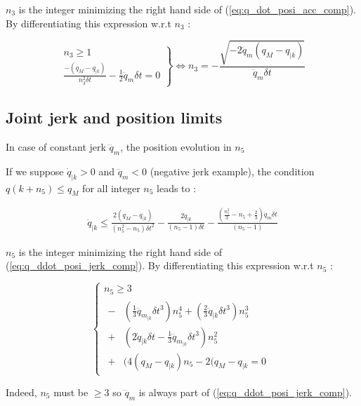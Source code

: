 \documentclass[a4paper, 10pt, conference]{ieeeconf}      %
\begin{document}
{{$n_3$ is the integer minimizing the right hand side of (\ref{eq:q_dot_posi_acc_comp}). By differentiating this expression w.r.t $n_3$ :

\begin{equation} 
\left. \begin{array}{r} 
n_3 \geq 1 \\
\frac{-(q_M-q_{|k})}{n_3^2 \delta t} - \frac{1}{2} \ddot{q}_m \delta t= 0
\end{array} \right\} 
\Leftrightarrow n_3=-\frac{\sqrt{-2\ddot{q}_m(q_M-q_{|k})}}{\ddot{q}_m \delta t}
\label{eq:n_3_eq}
\end{equation}

\subsection{Joint jerk and position limits}
In case of constant jerk $\dddot{q}_m$, the position evolution in $n_5$ 

If we suppose $\dot{q}_{|k} > 0$ and $\dddot{q}_m < 0$ (negative jerk example), the condition $q(k+n_5) \leq q_M$ for all integer $n_5$ leads to : 

\begin{equation}
\begin{split}
\ddot{q}_{|k} \leq \frac{2(q_M-q_{|k})}{(n_5^2-n_5) \delta t^2} - \frac{2 \dot{q}_{|k}}{(n_5-1) \delta t} - \frac{(\frac{n_5^2}{3}-n_5+\frac{2}{3})\ddot{q}_m \delta t}{(n_5-1)} 
\label{eq:q_ddot_posi_jerk_comp}
\end{split}
\end{equation}

$n_5$ is the integer minimizing the right hand side of (\ref{eq:q_ddot_posi_jerk_comp}). By differentiating this expression w.r.t $n_5$ :

\begin{equation}
\left\{\begin{array}{lcl}
n_5 \geq 3 \\
\begin{split}
-&(\frac{1}{3} \dddot{q}_m_{|k} \delta t^3) n_5^4 + (\frac{2}{3} \ddot{q}_{|k} \delta t^3) n_5^3  \\
+&(2 \dot{q}_{|k} \delta t - \frac{1}{3} \dddot{q}_m_{|k} \delta t^3) n_5^2 \\
+&(4 (q_M-q_{|k}) n_5 - 2(q_M-q_{|k}=0
\end{split}
\end{array}\right.
\label{eq:n_5_eq}
\end{equation}

Indeed, $n_5$ must be $\geq 3$ so $\dddot{q}_m$ is always part of (\ref{eq:q_ddot_posi_jerk_comp}). 

}}
\end{document}

